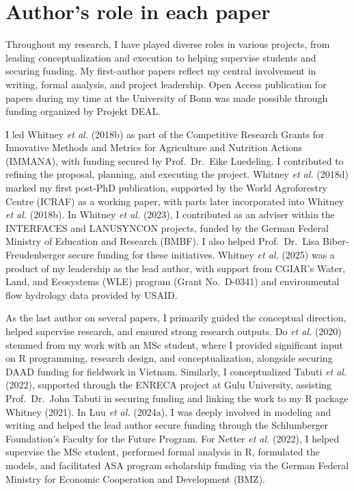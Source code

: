 \documentclass[
]{article}
\begin{document}
\newpage

\hypertarget{authors-role-in-each-paper}{%
\section*{Author's role in each
paper}\label{authors-role-in-each-paper}}

Throughout my research, I have played diverse roles in various projects,
from leading conceptualization and execution to helping supervise
students and securing funding. My first-author papers reflect my central
involvement in writing, formal analysis, and project leadership. Open
Access publication for papers during my time at the University of Bonn
was made possible through funding organized by Projekt DEAL.

I led Whitney \emph{et al.} (2018b) as part of the Competitive Research
Grants for Innovative Methods and Metrics for Agriculture and Nutrition
Actions (IMMANA), with funding secured by Prof.~Dr.~Eike Luedeling. I
contributed to refining the proposal, planning, and executing the
project. Whitney \emph{et al.} (2018d) marked my first post-PhD
publication, supported by the World Agroforestry Centre (ICRAF) as a
working paper, with parts later incorporated into Whitney \emph{et al.}
(2018b). In Whitney \emph{et al.} (2023), I contributed as an adviser
within the INTERFACES and LANUSYNCON projects, funded by the German
Federal Ministry of Education and Research (BMBF). I also helped
Prof.~Dr.~Lisa Biber-Freudenberger secure funding for these initiatives.
Whitney \emph{et al.} (2025) was a product of my leadership as the lead
author, with support from CGIAR's Water, Land, and Ecosystems (WLE)
program (Grant No.~D-0341) and environmental flow hydrology data
provided by USAID.

As the last author on several papers, I primarily guided the conceptual
direction, helped supervise research, and ensured strong research
outputs. Do \emph{et al.} (2020) stemmed from my work with an MSc
student, where I provided significant input on R programming, research
design, and conceptualization, alongside securing DAAD funding for
fieldwork in Vietnam. Similarly, I conceptualized Tabuti \emph{et al.}
(2022), supported through the ENRECA project at Gulu University,
assisting Prof.~Dr.~John Tabuti in securing funding and linking the work
to my R package Whitney (2021). In Luu \emph{et al.} (2024a), I was
deeply involved in modeling and writing and helped the lead author
secure funding through the Schlumberger Foundation's Faculty for the
Future Program. For Netter \emph{et al.} (2022), I helped supervise the
MSc student, performed formal analysis in R, formulated the models, and
facilitated ASA program scholarship funding via the German Federal
Ministry for Economic Cooperation and Development (BMZ).
\end{document}
